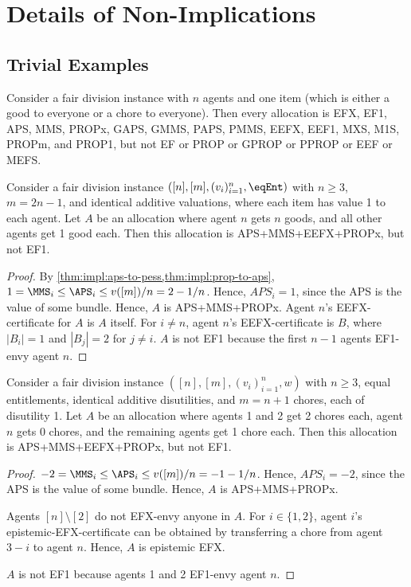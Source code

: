 \section{Details of Non-Implications}
\label{sec:cex-extra}

\subsection{Trivial Examples}
\label{sec:cex-extra:trivial}

\begin{example}
\label{cex:single-item}
Consider a fair division instance with $n$ agents and one item
(which is either a good to everyone or a chore to everyone).
Then every allocation is EFX, EF1, APS, MMS, PROPx, GAPS, GMMS, PAPS, PMMS,
EEFX, EEF1, MXS, M1S, PROPm, and PROP1,
but not EF or PROP or GPROP or PPROP or EEF or MEFS.
\end{example}

\begin{lemma}
\label{cex:share-vs-envy-goods}
Consider a fair division instance $([n], [m], (v_i)_{i=1}^n, \eqEnt)$
with $n \ge 3$, $m = 2n-1$, and identical additive valuations,
where each item has value 1 to each agent.
Let $A$ be an allocation where agent $n$ gets $n$ goods,
and all other agents get 1 good each.
Then this allocation is APS+MMS+EEFX+PROPx, but not EF1.
\end{lemma}
\begin{proof}
By \cref{thm:impl:aps-to-pess,thm:impl:prop-to-aps},
$1 = \MMS_i \le \APS_i \le v([m])/n = 2 - 1/n$.
Hence, $APS_i = 1$, since the APS is the value of some bundle.
Hence, $A$ is APS+MMS+PROPx.
Agent $n$'s EEFX-certificate for $A$ is $A$ itself.
For $i \neq n$, agent $n$'s EEFX-certificate is $B$,
where $|B_i| = 1$ and $|B_j| = 2$ for $j \neq i$.
%
$A$ is not EF1 because the first $n-1$ agents EF1-envy agent $n$.
\end{proof}

\begin{lemma}
\label{cex:share-vs-envy-chores}
Consider a fair division instance $([n], [m], (v_i)_{i=1}^n, w)$
with $n \ge 3$, equal entitlements, identical additive disutilities,
and $m = n+1$ chores, each of disutility 1.
Let $A$ be an allocation where agents 1 and 2 get 2 chores each,
agent $n$ gets 0 chores, and the remaining agents get 1 chore each.
Then this allocation is APS+MMS+EEFX+PROPx, but not EF1.
\end{lemma}
\begin{proof}
$-2 = \MMS_i \le \APS_i \le v([m])/n = - 1 - 1/n$.
Hence, $APS_i = -2$, since the APS is the value of some bundle.
Hence, $A$ is APS+MMS+PROPx.

Agents $[n] \setminus [2]$ do not EFX-envy anyone in $A$.
For $i \in \{1, 2\}$, agent $i$'s epistemic-EFX-certificate can be obtained by
transferring a chore from agent $3-i$ to agent $n$.
Hence, $A$ is epistemic EFX.

$A$ is not EF1 because agents 1 and 2 EF1-envy agent $n$.
\end{proof}

